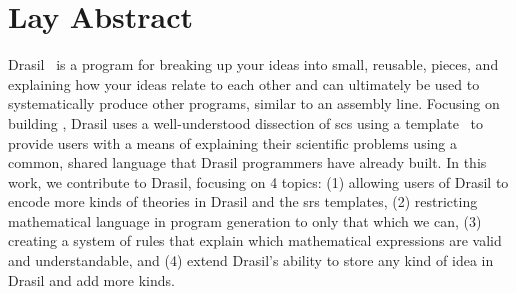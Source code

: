 \chapter{Lay Abstract}
\label{chap:lay_abstract}

Drasil~\cite{Drasil2021} is a program for breaking up your ideas into small,
reusable, pieces, and explaining how your ideas relate to each other and can
ultimately be used to systematically produce other programs, similar to an
assembly line. Focusing on building , Drasil uses a well-understood
dissection of \acs{scs} using a  template~\cite{SmithAndLai2005} to
provide users with a means of explaining their scientific problems using a
common, shared language that Drasil programmers have already built. In this
work, we contribute to Drasil, focusing on 4 topics: (1) allowing users of
Drasil to encode more kinds of theories in Drasil and the \acs{srs} templates,
(2) restricting mathematical language in program generation to only that which
we can, (3) creating a system of rules that explain which mathematical
expressions are valid and understandable, and (4) extend Drasil's ability to
store any kind of idea in Drasil and add more kinds.
